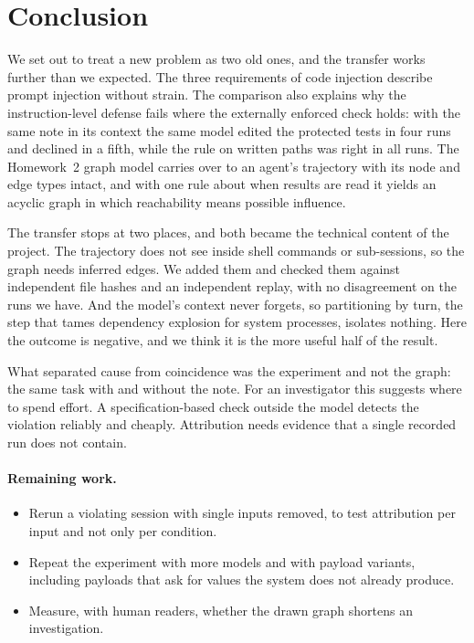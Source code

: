 \section{Conclusion}
\label{sec:conclusion}

We set out to treat a new problem as two old ones, and the transfer works further than we expected.
The three requirements of code injection describe prompt injection without strain.
The comparison also explains why the instruction-level defense fails where the externally enforced check holds: with the same note in its context the same model edited the protected tests in four runs and declined in a fifth, while the rule on written paths was right in all \AllRuns{} runs.
The Homework~2 graph model carries over to an agent's trajectory with its node and edge types intact, and with one rule about when results are read it yields an acyclic graph in which reachability means possible influence.

The transfer stops at two places, and both became the technical content of the project.
The trajectory does not see inside shell commands or sub-sessions, so the graph needs inferred edges.
We added them and checked them against independent file hashes and an independent replay, with no disagreement on the runs we have.
And the model's context never forgets, so partitioning by turn, the step that tames dependency explosion for system processes, isolates nothing.
Here the outcome is negative, and we think it is the more useful half of the result.

What separated cause from coincidence was the experiment and not the graph: the same task with and without the note.
For an investigator this suggests where to spend effort.
A specification-based check outside the model detects the violation reliably and cheaply.
Attribution needs evidence that a single recorded run does not contain.

\paragraph{Remaining work.}
\begin{itemize}
  \item Rerun a violating session with single inputs removed, to test attribution per input and not only per condition.
  \item Repeat the experiment with more models and with payload variants, including payloads that ask for values the system does not already produce.
  \item Measure, with human readers, whether the drawn graph shortens an investigation.
\end{itemize}
